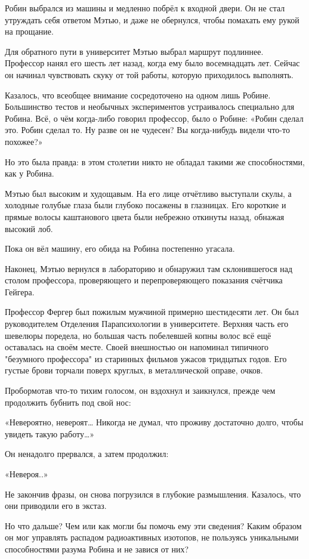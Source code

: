 \documentclass[a5paper, 9pt,
final, openany, twoside=true]{memoir}
\begin{document}
Робин выбрался из машины и медленно побрёл к входной двери. Он не стал утруждать себя ответом Мэтью, и даже не обернулся, чтобы помахать ему рукой на прощание.\bigskip

Для обратного пути в университет Мэтью выбрал маршрут подлиннее. Профессор нанял его шесть лет назад, когда ему было восемнадцать лет. Сейчас он начинал чувствовать скуку от той работы, которую приходилось выполнять.

Казалось, что всеобщее внимание сосредоточено на одном лишь Робине. Большинство тестов и необычных экспериментов устраивалось специально для Робина. Всё, о чём когда-либо говорил профессор, было о Робине: «Робин сделал это. Робин сделал то. Ну разве он не чудесен? Вы когда-нибудь видели что-то похожее?»

Но это была правда: в этом столетии никто не обладал такими же способностями, как у Робина.\bigskip

Мэтью был высоким и худощавым. На его лице отчётливо выступали скулы, а холодные голубые глаза были глубоко посажены в глазницах. Его короткие и прямые волосы каштанового цвета были небрежно откинуты назад, обнажая высокий лоб.

Пока он вёл машину, его обида на Робина постепенно угасала.\bigskip

Наконец, Мэтью вернулся в лабораторию и обнаружил там склонившегося над столом профессора, проверяющего и перепроверяющего показания счётчика Гейгера.

Профессор Фергер был пожилым мужчиной примерно шестидесяти лет. Он был руководителем Отделения Парапсихологии в университете. Верхняя часть его шевелюры поредела, но большая часть побелевшей копны волос всё ещё оставалась на своём месте. Своей внешностью он напоминал типичного "безумного профессора" из старинных фильмов ужасов тридцатых годов. Его густые брови торчали поверх круглых, в металлической оправе, очков.

Пробормотав что-то тихим голосом, он вздохнул и заикнулся, прежде чем продолжить бубнить под свой нос:

«Невероятно, невероят… Никогда не думал, что проживу достаточно долго, чтобы увидеть такую работу…»

Он ненадолго прервался, а затем продолжил:

«Невероя..»

Не закончив фразы, он снова погрузился в глубокие размышления. Казалось, что они приводили его в экстаз.

Но что дальше? Чем или как могли бы помочь ему эти сведения? Каким образом он мог управлять распадом радиоактивных изотопов, не пользуясь уникальными способностями разума Робина и не завися от них?
\end{document}
